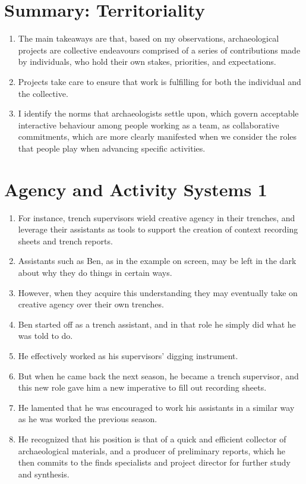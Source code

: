 \documentclass[12pt]{article}
\begin{document}
\section{Summary: Territoriality}
\begin{enumerate}
  \item The main takeaways are that, based on my observations, archaeological projects are collective endeavours comprised of a series of contributions made by individuals, who hold their own stakes, priorities, and expectations.
  \item Projects take care to ensure that work is fulfilling for both the individual and the collective.
  \item I identify the norms that archaeologists settle upon, which govern acceptable interactive behaviour among people working as a team, as collaborative commitments, which are more clearly manifested when we consider the roles that people play when advancing specific activities.
\end{enumerate}

\section{Agency and Activity Systems 1}
\begin{enumerate}
  \item For instance, trench supervisors wield creative agency in their trenches, and leverage their assistants as tools to support the creation of context recording sheets and trench reports.
  \item Assistants such as Ben, as in the example on screen, may be left in the dark about why they do things in certain ways.
  \item However, when they acquire this understanding they may eventually take on creative agency over their own trenches.
  \item Ben started off as a trench assistant, and in that role he simply did what he was told to do.
  \item He effectively worked as his supervisors' digging instrument.
  \item But when he came back the next season, he became a trench supervisor, and this new role gave him a new imperative to fill out recording sheets.
  \item He lamented that he was encouraged to work his assistants in a similar way as he was worked the previous season.
  \item He recognized that his position is that of a quick and efficient collector of archaeological materials, and a producer of preliminary reports, which he then commits to the finds specialists and project director for further study and synthesis.
\end{enumerate}
\end{document}

